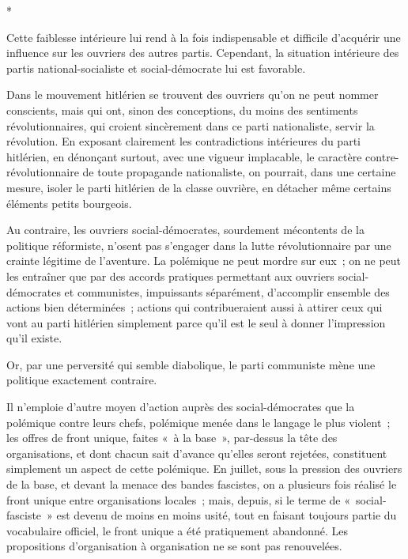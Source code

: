 \documentclass[french,twoside]{book} %
\begin{document}
\begin{center}
*\end{center}
\noindent Cette faiblesse intérieure lui rend à la fois indispensable et difficile d'ac­quérir une influence sur les ouvriers des autres partis. Cependant, la situation intérieure des partis national-socialiste et social-démocrate lui est favorable.\par
Dans le mouvement hitlérien se trouvent des ouvriers qu'on ne peut nom­mer conscients, mais qui ont, sinon des conceptions, du moins des sentiments révolutionnaires, qui croient sincèrement dans ce parti nationaliste, servir la révolution. En exposant clairement les contradictions intérieures du parti hitlérien, en dénonçant surtout, avec une vigueur implacable, le caractère contre-révolutionnaire de toute propagande nationaliste, on pourrait, dans une certaine mesure, isoler le parti hitlérien de la classe ouvrière, en détacher même certains éléments petits bourgeois.\par
Au contraire, les ouvriers social-démocrates, sourdement mécontents de la politique réformiste, n'osent pas s'engager dans la lutte révolutionnaire par une crainte légitime de l'aventure. La polémique ne peut mordre sur eux ; on ne peut les entraîner que par des accords pratiques permettant aux ouvriers social-démocrates et communistes, impuissants séparément, d'accomplir ensemble des actions bien déterminées ; actions qui contribueraient aussi à attirer ceux qui vont au parti hitlérien simplement parce qu'il est le seul à donner l'impression qu'il existe.\par
Or, par une perversité qui semble diabolique, le parti communiste mène une politique exactement contraire.\par
Il n'emploie d'autre moyen d'action auprès des social-démocrates que la polémique contre leurs chefs, polémique menée dans le langage le plus violent ; les offres de front unique, faites « à la base », par-dessus la tête des organisations, et dont chacun sait d'avance qu'elles seront rejetées, constituent simplement un aspect de cette polémique. En juillet, sous la pression des ouvriers de la base, et devant la menace des bandes fascistes, on a plusieurs fois réalisé le front unique entre organisations locales ; mais, depuis, si le terme de « social-fasciste » est devenu de moins en moins usité, tout en faisant toujours partie du vocabulaire officiel, le front unique a été pratiquement abandonné. Les propositions d'organisation à organisation ne se sont pas renouvelées.\par
\end{document}
